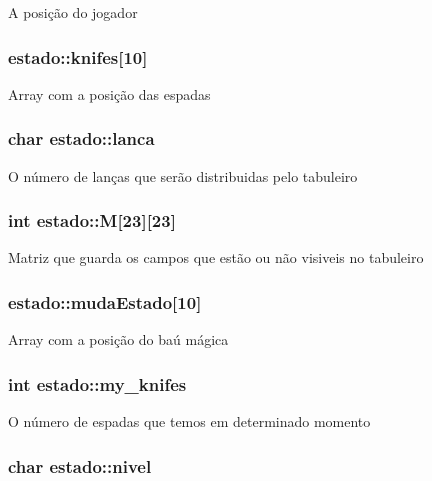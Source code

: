 A posição do jogador \hypertarget{structestado_a0e31bf5f0fcb0eda5d1cf8326e0afe1b}{
\subsubsection[{knifes}]{ estado\+::knifes\mbox{[}10\mbox{]}}}\label{structestado_a0e31bf5f0fcb0eda5d1cf8326e0afe1b}
Array com a posição das espadas \hypertarget{structestado_ad8331bf08d6d11e7590dd28d87471e40}{
\subsubsection[{lanca}]{\setlength{\rightskip}{0pt plus 5cm}char estado\+::lanca}}\label{structestado_ad8331bf08d6d11e7590dd28d87471e40}
O número de lanças que serão distribuidas pelo tabuleiro \hypertarget{structestado_aaafe981518f0c0aab09e842e9e8c3564}{
\subsubsection[{M}]{\setlength{\rightskip}{0pt plus 5cm}int estado\+::\+M\mbox{[}23\mbox{]}\mbox{[}23\mbox{]}}}\label{structestado_aaafe981518f0c0aab09e842e9e8c3564}
Matriz que guarda os campos que estão ou não visiveis no tabuleiro \hypertarget{structestado_a6b5ca65721918ba9f58752b16b37f69b}{
\subsubsection[{muda\+Estado}]{ estado\+::muda\+Estado\mbox{[}10\mbox{]}}}\label{structestado_a6b5ca65721918ba9f58752b16b37f69b}
Array com a posição do baú mágica \hypertarget{structestado_a430d95bf7e8f9bb91974c559c721fffd}{
\subsubsection[{my\+\_\+knifes}]{\setlength{\rightskip}{0pt plus 5cm}int estado\+::my\+\_\+knifes}}\label{structestado_a430d95bf7e8f9bb91974c559c721fffd}
O número de espadas que temos em determinado momento \hypertarget{structestado_a620f2f81ebfe4cba1d6e44b09a1762f7}{
\subsubsection[{nivel}]{\setlength{\rightskip}{0pt plus 5cm}char estado\+::nivel}}\label{structestado_a620f2f81ebfe4cba1d6e44b09a1762f7}
